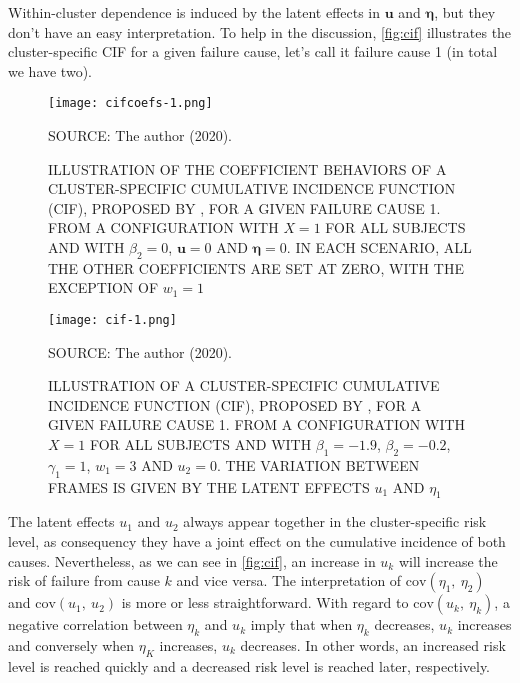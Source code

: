 Within-cluster dependence is induced by the latent effects in \(\bm{u}\)
and \(\bm{\eta}\), but they don't have an easy interpretation. To help
in the discussion, \autoref{fig:cif} illustrates the cluster-specific
CIF for a given failure cause, let's call it failure cause 1 (in total
we have two).

\begin{figure}[H]
  \setlength{\abovecaptionskip}{.0001pt}
  \caption{ILLUSTRATION OF THE COEFFICIENT BEHAVIORS OF A
    CLUSTER-SPECIFIC CUMULATIVE INCIDENCE FUNCTION (CIF), PROPOSED BY
    , FOR A GIVEN FAILURE CAUSE 1. FROM A
    CONFIGURATION WITH \(X = 1\) FOR ALL SUBJECTS AND WITH \(\beta_{2} =
    0\), \(\bm{u} = 0\) AND \(\bm{\eta} = 0\). IN EACH SCENARIO, ALL THE
    OTHER COEFFICIENTS ARE SET AT ZERO, WITH THE EXCEPTION OF \(w_{1} =
    1\)}
  \vspace{0.3cm} \centering
  \texttt{[image: cifcoefs-1.png]}
  \\
  \vspace{0.1cm}
  \begin{footnotesize}
    SOURCE: The author (2020).
  \end{footnotesize}
  \label{fig:cifcoefs}
\end{figure}

\begin{figure}[H]
  \setlength{\abovecaptionskip}{.0001pt}
  \caption{ILLUSTRATION OF A CLUSTER-SPECIFIC CUMULATIVE INCIDENCE
    FUNCTION (CIF), PROPOSED BY , FOR A GIVEN
    FAILURE CAUSE 1. FROM A CONFIGURATION WITH \(X = 1\) FOR ALL
    SUBJECTS AND WITH \(\beta_{1} = -1.9\), \(\beta_{2} = -0.2\),
    \(\gamma_{1} = 1\), \(w_{1} = 3\) AND \(u_{2} = 0\). THE VARIATION
    BETWEEN FRAMES IS GIVEN BY THE LATENT EFFECTS \(u_{1}\) AND
    \(\eta_{1}\)}
  \vspace{0.425cm} \centering
  \texttt{[image: cif-1.png]}
  \\
  \vspace{0.45cm}
  \begin{footnotesize}
    SOURCE: The author (2020).
  \end{footnotesize}
  \label{fig:cif}
\end{figure}

The latent effects \(u_{1}\) and \(u_{2}\) always appear together in the
cluster-specific risk level, as consequency they have a joint effect on
the cumulative incidence of both causes. Nevertheless, as we can see in
\autoref{fig:cif}, an increase in \(u_{k}\) will increase the risk of
failure from cause \(k\) and vice versa. The interpretation of
\(\text{cov}(\eta_{1},~\eta_{2})\) and \(\text{cov}(u_{1},~u_{2})\) is
more or less straightforward. With regard to
\(\text{cov}(u_{k},~\eta_{k})\), a negative correlation between
\(\eta_{k}\) and \(u_{k}\) imply that when \(\eta_{k}\) decreases,
\(u_{k}\) increases and conversely when \(\eta_{K}\) increases,
\(u_{k}\) decreases. In other words, an increased risk level is reached
quickly and a decreased risk level is reached later, respectively.

